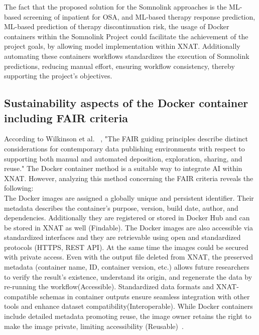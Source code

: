 The fact that the proposed solution for the Somnolink approaches is the ML-based screening of inpatient for OSA, and ML-based therapy response prediction, ML-based prediction of therapy discontinuation risk, the usage of Docker containers within the Somnolink Project could facilitate the achievement of the project goals, by allowing model implementation within XNAT. Additionally  automating these containers workflows standardizes the execution of Somnolink predictions, reducing manual effort, ensuring workflow consistency, thereby supporting the project's objectives.\\









\subsection{Sustainability aspects of the Docker container including FAIR criteria}

According to Wilkinson et al. ~\cite{FAIR}, "The FAIR guiding principles describe distinct considerations for contemporary data publishing environments with respect to supporting both manual and automated deposition, exploration, sharing, and reuse." The Docker container method is a suitable way to integrate AI within XNAT. However, analyzing this method concerning the FAIR criteria reveals the following:\\
The Docker images are assigned a globally unique and persistent identifier. Their metadata describes the container’s purpose, version, build date, author, and dependencies. Additionally they are registered or stored in Docker Hub and can be stored in XNAT as well (Findable).
The Docker images are also accessible via standardized interfaces and they are retrievable using open and standardized protocols (HTTPS, REST API). At the same time the images could be secured with private access. Even with the output file deleted from XNAT, the preserved metadata (container name, ID, container version, etc.) allows future researchers to verify the result's existence, understand its origin, and regenerate the data by re-running the workflow(Accessible). Standardized data formats and XNAT-compatible schemas in container outputs ensure seamless integration with other tools and enhance dataset compatibility(Interoperable). While Docker containers include detailed metadata promoting reuse, the image owner retains the right to make the image private, limiting accessibility (Reusable)~\cite{FAIR}.

